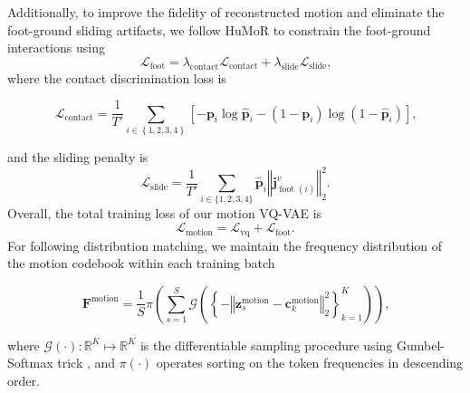 Additionally, to improve the fidelity of reconstructed motion and eliminate the foot-ground sliding artifacts, we follow HuMoR \cite{rempe2021humor} to constrain the foot-ground interactions using
\begin{equation}
    \mathcal{L}_{\text{foot}} = \lambda_{\textrm{contact}}\mathcal L_{\textrm{contact}} + \lambda_{\textrm{slide}}\mathcal L_{\textrm{slide}}\text{,}
\end{equation}
where the contact discrimination loss is
\begin{footnotesize}
\begin{equation}
    \mathcal L_{\textrm{contact}} = \frac{1}{T'}\sum_{i\in\left\{1,2,3,4\right\}} \left[-\mathbf{p}_i\log\hat{\mathbf{p}}_i-\left(1-\mathbf{p}_i\right)\log\left(1-\hat{\mathbf{p}}_i\right)\right] \text{,}
    \label{eq:contat_loss}
\end{equation}
\end{footnotesize}
and the sliding penalty is
\begin{equation}
    \mathcal L_{\textrm{slide}} = \frac{1}{T'}\sum_{i\in\{1,2,3,4\}}\hat{\mathbf{p}}_i\left\Vert \mathbf j^v_{\operatorname{foot}\left(i\right)}\right\Vert_2^2\text{.}
    \label{eq:velocity_loss}
\end{equation}
Overall, the total training loss of our motion VQ-VAE is
\begin{equation}
    \mathcal{L}_{\text{motion}} = \mathcal{L}_\text{vq} + \mathcal{L}_\text{foot}\text{.}
\end{equation}
For following distribution matching, we maintain the frequency distribution of the motion codebook within each training batch
\begin{footnotesize}
\begin{equation}
  \mathbf{F}^{\textrm{motion}} = \frac{1}{S}\pi\left(\sum_{s=1}^S \mathcal{G}\left(\left\{-\left\Vert\mathbf{z}_s^\textrm{motion}-\mathbf{c}_k^\textrm{motion}\right\Vert_2^2\right\}_{k=1}^K\right)\right)\text{,}
\label{eq:gumbel_softmax}
\end{equation}
\end{footnotesize}
where $\mathcal{G}(\cdot):\mathbb{R}^{K}\mapsto\mathbb{R}^{K}$ is the differentiable sampling procedure using Gumbel-Softmax trick \cite{jang2016categorical}, and $\pi(\cdot)$ operates sorting on the token frequencies in descending order.

